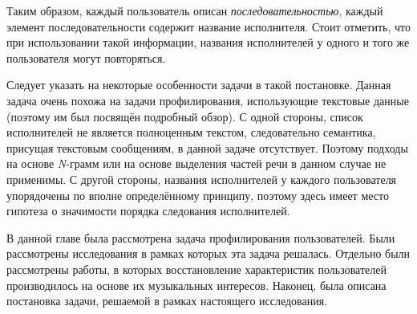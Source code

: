 Таким образом, каждый пользователь описан \textit{последовательностью},
каждый элемент последовательности содержит название исполнителя.
Стоит отметить, что при использовании такой информации, названия
исполнителей у одного и того же пользователя могут повторяться.

Следует указать на некоторые особенности задачи в такой постановке.
Данная задача очень похожа на задачи профилирования,
использующие текстовые данные (поэтому им был посвящён подробный обзор).
С одной стороны, список исполнителей не является полноценным текстом,
следовательно семантика, присущая текстовым сообщениям, в данной задаче
отсутствует. Поэтому подходы на основе \textit{N}-грамм или на основе
выделения частей речи в данном случае не применимы. С другой стороны,
названия исполнителей у каждого пользователя упорядочены по вполне
определённому принципу, поэтому здесь имеет место гипотеза о значимости
порядка следования исполнителей.

\chapterconclusion

В данной главе была рассмотрена задача профилирования пользователей.
Были рассмотрены исследования в рамках которых эта задача решалась.
Отдельно были рассмотрены работы, в которых восстановление
характеристик пользователей производилось на основе их музыкальных
интересов. Наконец, была описана постановка задачи, решаемой в
рамках настоящего исследования.

